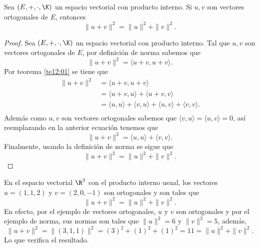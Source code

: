 \documentclass[compacto,10pt]{pubciencias-notas}
\begin{document}
\begin{teo}
    Sea $(E,+,\cdot,\K)$ un espacio vectorial con producto interno.
    Si $u,v$ son vectores ortogonales de $E$, entonces
    \[
        \| u + v \|^2 = \|u\|^2 + \|v\|^2.
    \]
\end{teo}
\begin{proof}
    Sea $(E,+,\cdot,\K)$ un espacio vectorial con producto interno.
    Tal que  $u,v$ son vectores ortogonales de $E$, por definición de norma sabemos que 
    \[
    \| u + v \|^2 =\langle u+v,u+v\rangle.
    \]
    Por teorema \ref{te12:01} se tiene que 
    \begin{align*}
         \| u + v \|^2 &=\langle u+v,u+v\rangle\\
         &=\langle u+v,u\rangle+\langle u+v,v\rangle\\
         &=\langle u,u\rangle+\langle v,u\rangle+\langle u,v\rangle+\langle v,v\rangle.\\
    \end{align*}
    Además como $u,v$ son vectores ortogonales sabemos que $\langle v,u\rangle = \langle u,v\rangle =0 $, así reemplazando en la anterior ecuación tenemos que 
    \[
    \| u + v \|^2=\langle u,u\rangle+\langle v,v\rangle.
    \]
    Finalmente, usando la definición de norma se sigue que
    \[
    \| u + v \|^2 = \|u\|^2 + \|v\|^2.
    \]
\end{proof}

\begin{ejem}\hspace{0pt}\label{Sem08:EjemPit} En el espacio vectorial $\R^{3}$ con el producto interno usual, los vectores $u=(1,1,2)$ y $v=(2,0,-1)$ son ortogonales y son tales que 
\[
    \| u + v \|^2 = \|u\|^2 + \|v\|^2.
\]
En efecto, por el ejemplo de vectores ortogonales, $u$ y $v$ son ortogonales y por el ejemplo de norma, sus normas son tales que $\|u\|^{2}=6$ y $\|v\|^{2}=5$, además,
\[
    \|u + v\|^{2} = \|(3,1,1)\|^{2} = (3)^{2} + (1)^{2} + (1)^{2} = 11=\|u\|^{2}+\|v\|^{2}.
\]
Lo que verifica el resultado.
\end{ejem}
\end{document}
